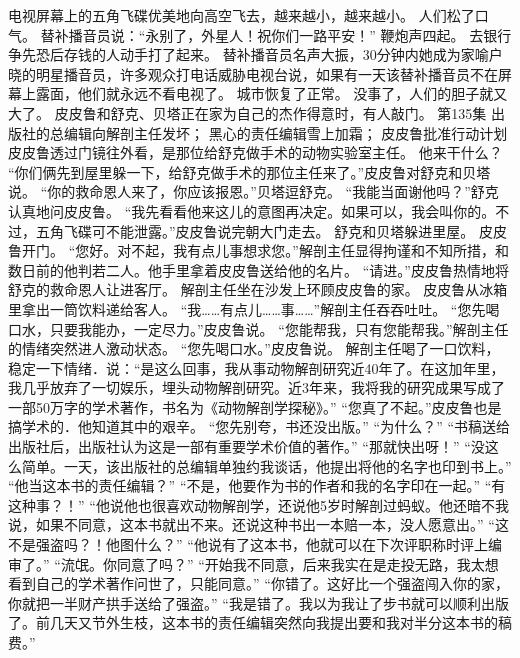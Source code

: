 \documentclass[a4paper,12pt,UTF8,twoside]{ctexbook}
\begin{document}
        电视屏幕上的五角飞碟优美地向高空飞去，越来越小，越来越小。 
        人们松了口气。 
        替补播音员说：“永别了，外星人！祝你们一路平安！” 
        鞭炮声四起。 
        去银行争先恐后存钱的人动手打了起来。 
        替补播音员名声大振，30分钟内她成为家喻户晓的明星播音员，许多观众打电话威胁电视台说，如果有一天该替补播音员不在屏幕上露面，他们就永远不看电视了。 
        城市恢复了正常。 
        没事了，人们的胆子就又大了。 
        皮皮鲁和舒克、贝塔正在家为自己的杰作得意时，有人敲门。   第135集 
        出版社的总编辑向解剖主任发坏； 
        黑心的责任编辑雪上加霜； 
        皮皮鲁批准行动计划   
        皮皮鲁透过门镜往外看，是那位给舒克做手术的动物实验室主任。 
        他来干什么？ 
        “你们俩先到屋里躲一下，给舒克做手术的那位主任来了。”皮皮鲁对舒克和贝塔说。 
        “你的救命恩人来了，你应该报恩。”贝塔逗舒克。 
        “我能当面谢他吗？”舒克认真地问皮皮鲁。 
        “我先看看他来这儿的意图再决定。如果可以，我会叫你的。不过，五角飞碟可不能泄露。”皮皮鲁说完朝大门走去。 
        舒克和贝塔躲进里屋。 
        皮皮鲁开门。 
        “您好。对不起，我有点儿事想求您。”解剖主任显得拘谨和不知所措，和数日前的他判若二人。他手里拿着皮皮鲁送给他的名片。 
        “请进。”皮皮鲁热情地将舒克的救命恩人让进客厅。 
        解剖主任坐在沙发上环顾皮皮鲁的家。 
        皮皮鲁从冰箱里拿出一筒饮料递给客人。 
        “我……有点儿……事……”解剖主任吞吞吐吐。 
        “您先喝口水，只要我能办，一定尽力。”皮皮鲁说。 
        “您能帮我，只有您能帮我。”解剖主任的情绪突然进人激动状态。 
        “您先喝口水。”皮皮鲁说。 
        解剖主任喝了一口饮料，稳定一下情绪．说：“是这么回事，我从事动物解剖研究近40年了。在这加年里，我几乎放弃了一切娱乐，埋头动物解剖研究。近3年来，我将我的研究成果写成了一部50万字的学术著作，书名为《动物解剖学探秘》。” 
        “您真了不起。”皮皮鲁也是搞学术的．他知道其中的艰辛。 
        “您先别夸，书还没出版。” 
        “为什么？” 
        “书稿送给出版社后，出版社认为这是一部有重要学术价值的著作。” 
        “那就快出呀！” 
        “没这么简单。一天，该出版社的总编辑单独约我谈话，他提出将他的名字也印到书上。” 
        “他当这本书的责任编辑？” 
        “不是，他要作为书的作者和我的名字印在一起。” 
        “有这种事？！” 
        “他说他也很喜欢动物解剖学，还说他5岁时解剖过蚂蚁。他还暗不我说，如果不同意，这本书就出不来。还说这种书出一本赔一本，没人愿意出。” 
        “这不是强盗吗？！他图什么？” 
        “他说有了这本书，他就可以在下次评职称时评上编审了。” 
        “流氓。你同意了吗？” 
        “开始我不同意，后来我实在是走投无路，我太想看到自己的学术著作问世了，只能同意。” 
        “你错了。这好比一个强盗闯入你的家，你就把一半财产拱手送给了强盗。” 
        “我是错了。我以为我让了步书就可以顺利出版了。前几天又节外生枝，这本书的责任编辑突然向我提出要和我对半分这本书的稿费。” 
\end{document}
